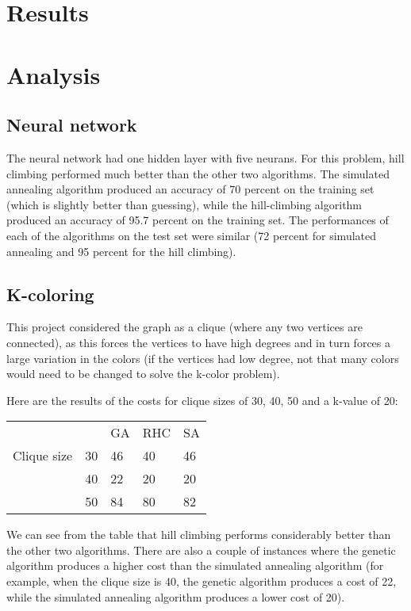 \documentclass[11pt]{article}
\begin{document}
        
        \section{Results}

        \section{Analysis}

        \subsection{Neural network}
        The neural network had one hidden layer
        with five neurans.
        For this problem, hill climbing performed much better than the other two algorithms.
        The simulated annealing algorithm produced an accuracy of 70 percent on the training set (which is slightly better
        than guessing), while the hill-climbing algorithm produced an accuracy of 95.7 percent on the training set. The performances
        of each of the algorithms on the test set were similar (72 percent for simulated annealing and 95 percent for the hill climbing).

        \subsection{K-coloring}

        This project considered the graph as a clique (where any two vertices are connected), as this forces the vertices to have
        high degrees and in turn forces a large variation in the colors (if the vertices had low degree, not that many colors
        would need to be changed to solve the k-color problem).

        Here are the results of the costs for clique sizes of 30, 40, 50 and a k-value of 20:

            \begin{tabular}{lllll}
                        &    & GA & RHC & SA \\
            Clique size & 30 & 46 & 40  & 46 \\
                        & 40 & 22 & 20  & 20 \\
                        & 50 & 84 & 80  & 82
            \end{tabular}
       
        We can see from the table that hill climbing performs considerably better than the other two algorithms.
        There are also a couple of instances where the genetic algorithm produces a higher cost than the simulated
        annealing algorithm (for example, when the clique size is 40, the genetic algorithm produces
        a cost of 22, while the simulated annealing algorithm produces a lower cost of 20).
\end{document}
